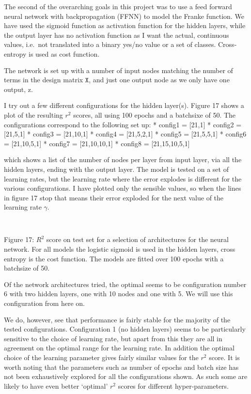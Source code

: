 \documentclass[11pt]{article}
\begin{document}
The second of the overarching goals in this project was to use a feed
forward neural network with backpropagation (FFNN) to model the Franke
function. We have used the sigmoid function as activation function for
the hidden layers, while the output layer has no activation function as
I want the actual, continuous values, i.e.~not translated into a binary
yes/no value or a set of classes. Cross-entropy is used as cost
function.

The network is set up with a number of input nodes matching the number
of terms in the design matrix \(\texttt{X}\), and just one output node
as we only have one output, z.

I try out a few different configurations for the hidden layer(s). Figure
17 shows a plot of the resulting \(r^2\) scores, all using 100 epochs
and a batchsixe of 50. The configurations correspond to the following
set up: * config1 = {[}21,1{]} * config2 = {[}21,5,1{]} * config3 =
{[}21,10,1{]} * config4 = {[}21,5,2,1{]} * config5 = {[}21,5,5,1{]} *
config6 = {[}21,10,5,1{]} * config7 = {[}21,10,10,1{]} * config8 =
{[}21,15,10,5,1{]}

which shows a list of the number of nodes per layer from input layer,
via all the hidden layers, ending with the output layer. The model is
tested on a set of learning rates, but the learning rate where the error
explodes is different for the various configurations. I have plotted
only the sensible values, so when the lines in figure 17 stop that means
their error exploded for the next value of the learning rate \(\gamma\).

    \begin{center}
    \end{center}
    { \hspace*{\fill} \\}
    
    Figure 17: \(R^2\) score on test set for a selection of architectures
for the neural network. For all models the logistic sigmoid is used in
the hidden layers, cross entropy is the cost function. The models are
fitted over 100 epochs with a batchsize of 50.

    Of the network architectures tried, the optimal seems to be
configuration number 6 with two hidden layers, one with 10 nodes and one
with 5. We will use this configuration from here on.

We do, however, see that performance is fairly stable for the majority
of the tested configurations. Configuration 1 (no hidden layers) seems to be
particularly sensitive to the choice of learning rate, but apart from
this they are all in agreement on the optimal range for the learning
rate. In addition the optimal choice of the learning parameter gives
fairly similar values for the \(r^2\) score. It is worth noting that the
parameters such as number of epochs and batch size has not been
exhaustively explored for all the configurations shown. As such some are
likely to have even better `optimal' \(r^2\) scores for different
hyper-parameters.
\end{document}
